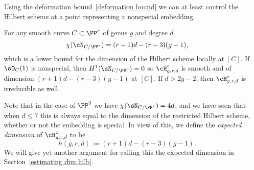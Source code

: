 Using the deformation bound~\ref{deformation bound} we can at least control the Hilbert scheme at
a point representing a nonspecial embedding. 

\begin{theorem}\label{nonspecial Hilbert}
For any smooth curve $C\subset \PP^{r}$ of genus $g$ and degree $d$
$$
\chi(\cN_{C/\PP^{r}}) = (r+1)d - (r-3)(g-1),
$$
which is a lower bound for the dimension of the Hilbert scheme locally at $[C]$. 
If $\sO_{C}(1)$ is nonspecial, 
 then $H^1(\sN_{C/\PP^r})=0$ so
 $\cH^\circ_{g,r,d}$ is smooth and of dimension $ (r+1)d - (r-3)(g-1)$ at $[C]$.
 If $d>2g-2$,
then $\cH^\circ_{g,r,d}$ is irreducible as well.
\end{theorem}

Note that in the case of $\PP^3$ we have $\chi(\sN_{C/\PP^r}) = 4d$, and we have
seen that when $d\leq 7$ this is always equal to the dimension of the restricted Hilbert
scheme, whether or not the embedding is special. In view of this,
we define the \emph{expected dimension} of $\cH^\circ_{g,r,d}$ to be
$$
h(g,r,d) := (r+1)d - (r-3)(g-1).
$$
We will give yet another argument for calling this the expected dimension in Section~\ref{estimating dim hilb}.

